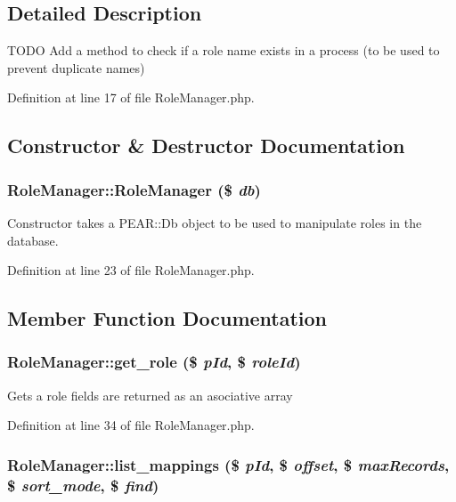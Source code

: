 \subsection{Detailed Description}
TODO Add a method to check if a role name exists in a process (to be used to prevent duplicate names) 



Definition at line 17 of file Role\-Manager.php.

\subsection{Constructor \& Destructor Documentation}
\subsubsection{\setlength{\rightskip}{0pt plus 5cm}Role\-Manager::Role\-Manager (\$ {\em db})}\label{classRoleManager_a0}


Constructor takes a PEAR::Db object to be used to manipulate roles in the database. 

Definition at line 23 of file Role\-Manager.php.

\subsection{Member Function Documentation}
\subsubsection{\setlength{\rightskip}{0pt plus 5cm}Role\-Manager::get\_\-role (\$ {\em p\-Id}, \$ {\em role\-Id})}\label{classRoleManager_a1}


Gets a role fields are returned as an asociative array 

Definition at line 34 of file Role\-Manager.php.
\subsubsection{\setlength{\rightskip}{0pt plus 5cm}Role\-Manager::list\_\-mappings (\$ {\em p\-Id}, \$ {\em offset}, \$ {\em max\-Records}, \$ {\em sort\_\-mode}, \$ {\em find})}\label{classRoleManager_a5}


